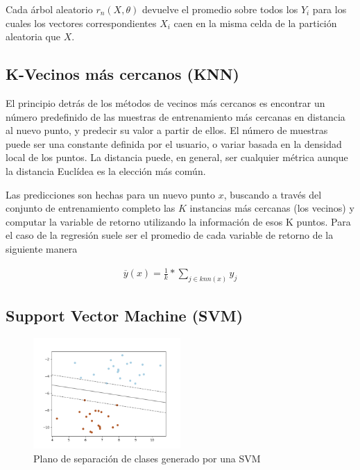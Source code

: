     Cada árbol aleatorio $r_{n}(X, \theta)$ devuelve el promedio sobre todos los
    $Y_{i}$ para los cuales los vectores correspondientes $X_{i}$ caen en la misma
    celda de la partición aleatoria que $X$.


\subsection{K-Vecinos más cercanos (KNN)}
  \par El principio detrás de los métodos de vecinos más cercanos es encontrar un
    número predefinido de las muestras de entrenamiento más cercanas en distancia
    al nuevo punto, y predecir su valor a partir de ellos.
    El número de muestras puede ser una constante definida por el usuario, o
    variar basada en la densidad local de los puntos. La distancia puede, en general,
    ser cualquier métrica aunque la distancia Euclídea es la elección más común.

  \par Las predicciones son hechas para un nuevo punto $x$, buscando a través del conjunto
    de entrenamiento completo las $K$ instancias más cercanas (los vecinos) y computar
    la variable de retorno utilizando la información de esos K puntos. Para el caso
    de la regresión suele ser el promedio de cada variable de retorno de la siguiente
    manera

    \begin{align}
      \overline{y}(x) = \frac{1}{k} * \sum_{j \in knn(x)} y_{j}
    \end{align}



\subsection{Support Vector Machine (SVM)}

  \begin{figure}
  \centering%
  \includegraphics[width=0.5\textwidth]{images/svm_hiperplane}%
  \caption{Plano de separación de clases generado por una SVM}\label{fig:svm}
  \end{figure}

